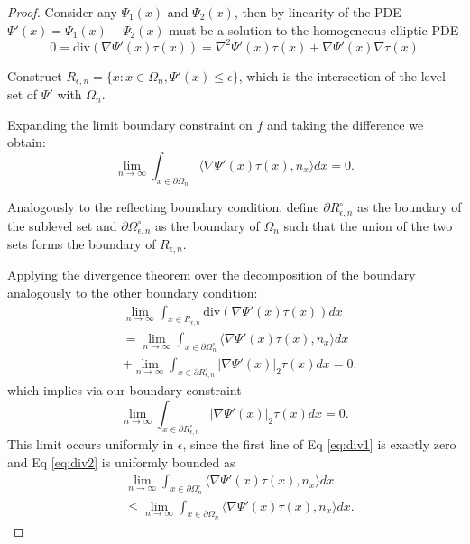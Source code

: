\documentclass{article}
\begin{document}
\begin{proof}
Consider any $\Psi_1(x)$ and $\Psi_2(x)$, then by linearity of the PDE $\Psi'(x)=\Psi_1(x) - \Psi_2(x)$ must be a solution to the homogeneous elliptic PDE
\[0 = \text{div}(\nabla \Psi'(x) \tau(x))=\nabla^2 \Psi'(x) \tau(x) + \nabla \Psi'(x) \nabla \tau(x)\]

Construct $R_{\epsilon,n} = \{x: x\in \Omega_n, \Psi'(x)\leq \epsilon\}$, which is the intersection of the level set of $\Psi'$ with $\Omega_n$.

Expanding the limit boundary constraint on $f$ and taking the difference we obtain:
\[\lim_{n\to \infty} \int_{x\in \partial \Omega_n} \langle \nabla \Psi'(x)\tau(x),n_x\rangle dx =0.\]

Analogously to the reflecting boundary condition, define $\partial R_{\epsilon,n}^\circ$ as the boundary of the sublevel set and $\partial \Omega_{\epsilon,n}^\circ$ as the boundary of $\Omega_n$ such that the union of the two sets forms the boundary of $R_{\epsilon,n}$.

Applying the divergence theorem over the decomposition of the boundary analogously to the other boundary condition:
\begin{align}\label{eq:div1}
&\lim_{n\to\infty}\int_{x\in R_{\epsilon,n}} \text{div}(\nabla \Psi'(x)\tau(x)) dx\\
\label{eq:div2}
&= \lim_{n\to \infty}\int_{x\in \partial \Omega_n^\circ} \langle \nabla \Psi'(x) \tau(x) , n_x \rangle dx \\
&+ \lim_{n\to\infty}\int_{x\in \partial R_{\epsilon,n}^\circ} |\nabla\Psi'(x)|_2\tau(x) dx = 0 .
\end{align}
which implies via our boundary constraint
\[\lim_{n\to\infty}\int_{x\in \partial R_{\epsilon,n}^\circ} |\nabla\Psi'(x)|_2\tau(x) dx = 0.\]
This limit occurs uniformly in $\epsilon$, since the first line of Eq \ref{eq:div1} is exactly zero and Eq \ref{eq:div2} is uniformly bounded as
\begin{align*}
&\lim_{n\to \infty}\int_{x\in \partial \Omega_n^\circ} \langle \nabla \Psi'(x) \tau(x) , n_x \rangle dx \\
&\leq \lim_{n\to \infty}\int_{x\in \partial \Omega_n} \langle \nabla \Psi'(x) \tau(x) , n_x \rangle dx.
\end{align*}



\end{proof}
\end{document}
